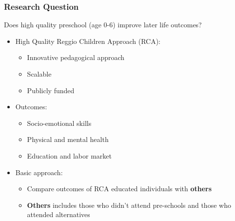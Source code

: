 \begin{frame}
\frametitle{Research Question} 

\begin{block}{}
Does high quality preschool (age 0-6) improve later life outcomes?
\end{block}

\vspace{2ex}

\begin{itemize}
	\item <2-> High Quality Reggio Children Approach (RCA):
	\begin{itemize}
		\item Innovative pedagogical approach
		\item Scalable
		\item Publicly funded
	\end{itemize}
	\vspace{1.5ex}
	\item <3-> Outcomes:
	\begin{itemize}
		\item Socio-emotional skills
		\item Physical and mental health
		\item Education and labor market
	\end{itemize}
	\vspace{1.5ex}
	\item <4-> Basic approach:
	\begin{itemize}
		\item Compare outcomes of RCA educated individuals with \textbf{others}
		\item \textbf{Others} includes those who didn't attend pre-schools and those who attended alternatives

	\end{itemize}
\end{itemize}
\vspace{10ex}

\end{frame} 
